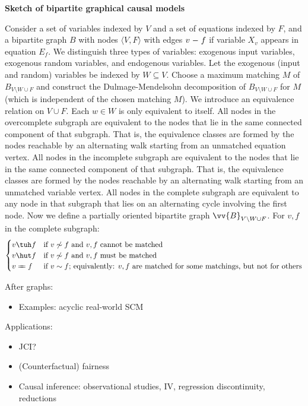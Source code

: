 \textbf{Sketch of bipartite graphical causal models}

Consider a set of variables indexed by $V$ and a set of equations indexed by $F$, and a bipartite graph $B$ with nodes $\langle V, F \rangle$ with edges $v \relbar f$ if variable $X_v$ appears in equation $E_f$.
We distinguish three types of variables: exogenous input variables, exogenous random variables, and endogenous variables.
Let the exogenous (input and random) variables be indexed by $W \subseteq V$.
Choose a maximum matching $M$ of $B_{V \setminus W \cup F}$ and construct the Dulmage-Mendelsohn decomposition of $B_{V \setminus W \cup F}$ for $M$
(which is independent of the chosen matching $M$).
We introduce an equivalence relation on $V \cup F$.
Each $w \in W$ is only equivalent to itself.
All nodes in the overcomplete subgraph are equivalent to the nodes that lie in the same connected component of that subgraph.
That is, the equivalence classes are formed by the nodes reachable by an alternating walk starting from an unmatched equation vertex.
All nodes in the incomplete subgraph are equivalent to the nodes that lie in the same connected component of that subgraph.
That is, the equivalence classes are formed by the nodes reachable by an alternating walk starting from an unmatched variable vertex.
All nodes in the complete subgraph are equivalent to any node in that subgraph that lies on an alternating cycle involving the first node.
Now we define a partially oriented bipartite graph $\vv{B}_{V \setminus W \cup F}$.
For $v,f$ in the complete subgraph:
  $$\begin{cases}
    v \tuh f & \text{if $v \not\sim f$ and $v,f$ cannot be matched} \\
    v \hut f & \text{if $v \not\sim f$ and $v,f$ must be matched} \\
    v \otto f & \text{if $v \sim f$; equivalently: $v,f$ are matched for some matchings, but not for others} 
  \end{cases}$$

After graphs:
\begin{itemize}
  \item Examples: acyclic real-world SCM
\end{itemize}

Applications:
\begin{itemize}
  \item JCI?
  \item (Counterfactual) fairness
  \item Causal inference: observational studies, IV, regression discontinuity, reductions
\end{itemize}

